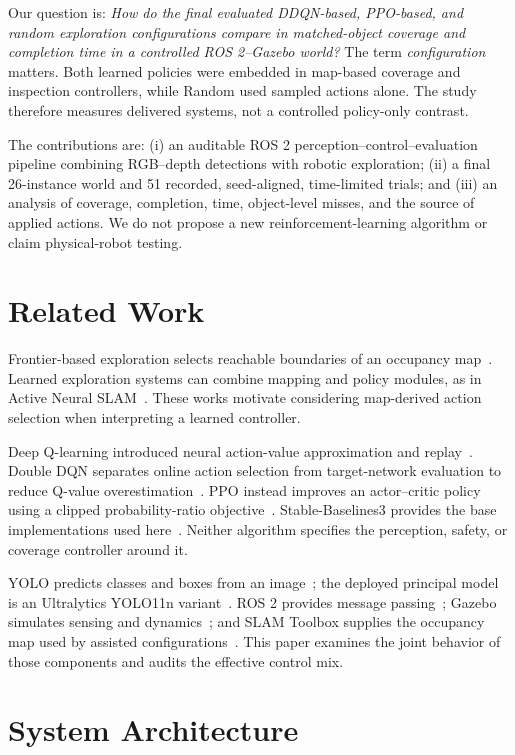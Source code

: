 \documentclass[conference]{IEEEtran}
\begin{document}
Our question is: \emph{How do the final evaluated DDQN-based, PPO-based, and random exploration configurations compare in matched-object coverage and completion time in a controlled ROS 2--Gazebo world?} The term \emph{configuration} matters. Both learned policies were embedded in map-based coverage and inspection controllers, while Random used sampled actions alone. The study therefore measures delivered systems, not a controlled policy-only contrast.

The contributions are: (i) an auditable ROS 2 perception--control--evaluation pipeline combining RGB--depth detections with robotic exploration; (ii) a final 26-instance world and 51 recorded, seed-aligned, time-limited trials; and (iii) an analysis of coverage, completion, time, object-level misses, and the source of applied actions. We do not propose a new reinforcement-learning algorithm or claim physical-robot testing.

\section{Related Work}
Frontier-based exploration selects reachable boundaries of an occupancy map~\cite{yamauchi1997}. Learned exploration systems can combine mapping and policy modules, as in Active Neural SLAM~\cite{chaplot2020}. These works motivate considering map-derived action selection when interpreting a learned controller.

Deep Q-learning introduced neural action-value approximation and replay~\cite{mnih2015}. Double DQN separates online action selection from target-network evaluation to reduce Q-value overestimation~\cite{vanhasselt2016}. PPO instead improves an actor--critic policy using a clipped probability-ratio objective~\cite{schulman2017}. Stable-Baselines3 provides the base implementations used here~\cite{raffin2021}. Neither algorithm specifies the perception, safety, or coverage controller around it.

YOLO predicts classes and boxes from an image~\cite{redmon2016}; the deployed principal model is an Ultralytics YOLO11n variant~\cite{ultralyticsmodels}. ROS 2 provides message passing~\cite{macenski2022}; Gazebo simulates sensing and dynamics~\cite{koenig2004}; and SLAM Toolbox supplies the occupancy map used by assisted configurations~\cite{macenski2021slam}. This paper examines the joint behavior of those components and audits the effective control mix.

\section{System Architecture}
\end{document}
